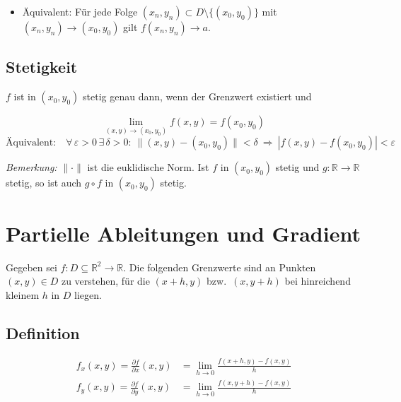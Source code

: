 \documentclass[a4paper,11pt,oneside,open=any,parskip=half, DIV=15]{scrreprt}
\begin{document}
      \begin{itemize}
      \item Äquivalent: Für jede Folge \((x_n,y_n)\subset D\setminus\{(x_0,y_0)\}\) mit \((x_n,y_n)\to(x_0,y_0)\) gilt \(f(x_n,y_n)\to a\).
      \end{itemize}

      \subsection*{Stetigkeit}

      \(f\) ist in \((x_0,y_0)\) stetig genau dann, wenn der Grenzwert existiert und
      \begin{importantbox}
      \[
         \lim_{(x,y)\to(x_0,y_0)} f(x,y)=f(x_0,y_0)
      \]
      \[
         \text{Äquivalent:}\quad
         \forall\,\varepsilon>0\,\exists\,\delta>0:\ 
         \|(x,y)-(x_0,y_0)\|<\delta\ \Rightarrow\ |f(x,y)-f(x_0,y_0)|<\varepsilon
      \]
      \end{importantbox}

      \emph{Bemerkung:} \(\|\cdot\|\) ist die euklidische Norm. Ist \(f\) in \((x_0,y_0)\) stetig und \(g:\mathbb{R}\to\mathbb{R}\) stetig, so ist auch \(g\circ f\) in \((x_0,y_0)\) stetig.


\section{Partielle Ableitungen und Gradient}

   Gegeben sei \(f:D\subseteq\mathbb{R}^2\to\mathbb{R}\).
   Die folgenden Grenzwerte sind an Punkten \((x,y)\in D\) zu verstehen, für die
   \((x+h,y)\) bzw.\ \((x,y+h)\) bei hinreichend kleinem \(h\) in \(D\) liegen.

   \subsection*{Definition}
      \begin{importantbox}
      \[
      \begin{aligned}
         f_x(x,y)=\frac{\partial f}{\partial x}(x,y)
            &= \lim_{h\to 0}\frac{f(x+h,y)-f(x,y)}{h}\\
         f_y(x,y)=\frac{\partial f}{\partial y}(x,y)
            &= \lim_{h\to 0}\frac{f(x,y+h)-f(x,y)}{h}
      \end{aligned}
      \]
      \end{importantbox}
\end{document}
